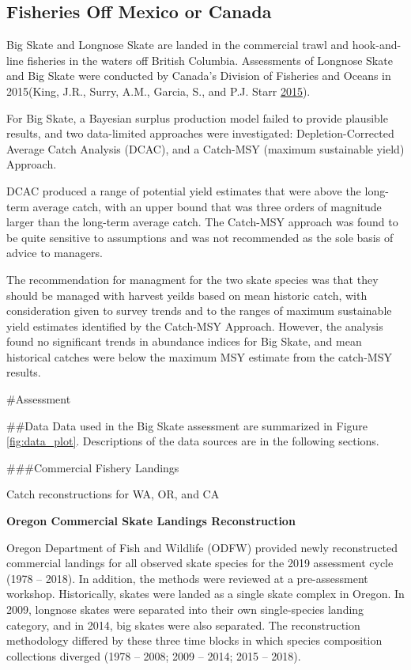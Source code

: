 \documentclass[12pt,]{article}
\begin{document}
\hypertarget{fisheries-off-mexico-or-canada}{%
\subsection{Fisheries Off Mexico or
Canada}\label{fisheries-off-mexico-or-canada}}

Big Skate and Longnose Skate are landed in the commercial trawl and
hook-and-line fisheries in the waters off British Columbia. Assessments
of Longnose Skate and Big Skate were conducted by Canada's Division of
Fisheries and Oceans in 2015(King, J.R., Surry, A.M., Garcia, S., and
P.J. Starr \protect\hyperlink{ref-King2015}{2015}).

For Big Skate, a Bayesian surplus production model failed to provide
plausible results, and two data-limited approaches were investigated:
Depletion-Corrected Average Catch Analysis (DCAC), and a Catch-MSY
(maximum sustainable yield) Approach.

DCAC produced a range of potential yield estimates that were above the
long-term average catch, with an upper bound that was three orders of
magnitude larger than the long-term average catch. The Catch-MSY
approach was found to be quite sensitive to assumptions and was not
recommended as the sole basis of advice to managers.

The recommendation for managment for the two skate species was that they
should be managed with harvest yeilds based on mean historic catch, with
consideration given to survey trends and to the ranges of maximum
sustainable yield estimates identified by the Catch-MSY Approach.
However, the analysis found no significant trends in abundance indices
for Big Skate, and mean historical catches were below the maximum MSY
estimate from the catch-MSY results.

\newpage

\#Assessment

\#\#Data Data used in the Big Skate assessment are summarized in Figure
\ref{fig:data_plot}. Descriptions of the data sources are in the
following sections.

\#\#\#Commercial Fishery Landings

Catch reconstructions for WA, OR, and CA

\textbf{Oregon Commercial Skate Landings Reconstruction}

Oregon Department of Fish and Wildlife (ODFW) provided newly
reconstructed commercial landings for all observed skate species for the
2019 assessment cycle (1978 -- 2018). In addition, the methods were
reviewed at a pre-assessment workshop. Historically, skates were landed
as a single skate complex in Oregon. In 2009, longnose skates were
separated into their own single-species landing category, and in 2014,
big skates were also separated. The reconstruction methodology differed
by these three time blocks in which species composition collections
diverged (1978 -- 2008; 2009 -- 2014; 2015 -- 2018).
\end{document}

